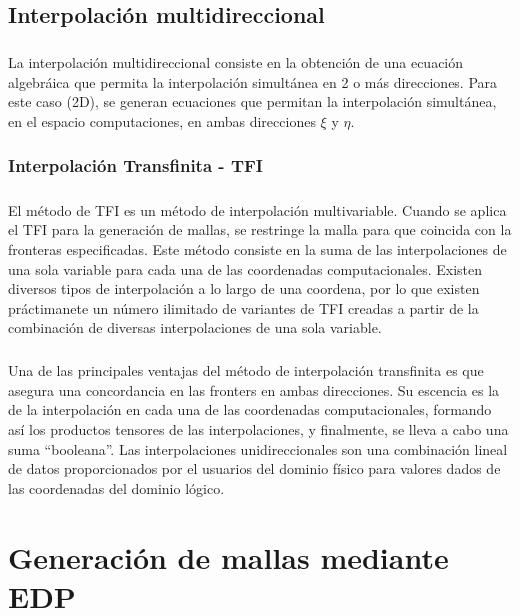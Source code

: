 \documentclass[letterpaper, openright, 12pt]{book}
\begin{document}
	\section{Interpolación multidireccional}
		\paragraph*{}
			La interpolación multidireccional consiste en la obtención de una ecuación algebráica que permita la interpolación simultánea en 2 o más direcciones. Para este caso (2D), se generan ecuaciones que permitan la interpolación simultánea, en el espacio computaciones, en ambas direcciones $\xi$ y $\eta$.
		\subsection{Interpolación Transfinita - TFI}
			\paragraph*{}
				El método de TFI es un método de interpolación multivariable. Cuando se aplica el TFI para la generación de mallas, se restringe la malla para que coincida con la fronteras especificadas. Este método consiste en la suma de las interpolaciones de una sola variable para cada una de las coordenadas computacionales. Existen diversos tipos de interpolación a lo largo de una coordena, por lo que existen práctimanete un número ilimitado de variantes de TFI creadas a partir de la combinación de diversas interpolaciones de una sola variable.\cite{thompsonhandbook}
			\paragraph*{}
				Una de las principales ventajas del método de interpolación transfinita es que asegura una concordancia en las fronters en ambas direcciones. Su escencia es la de la interpolación en cada una de las coordenadas computacionales, formando así los productos tensores de las interpolaciones, y finalmente, se lleva a cabo una suma ``booleana''. Las interpolaciones unidireccionales son una combinación lineal de datos proporcionados por el usuarios del dominio físico para valores dados de las coordenadas del dominio lógico.
%
%
%
%
%

%
%
%
%
%
\chapter{Generación de mallas mediante EDP}
\end{document}
